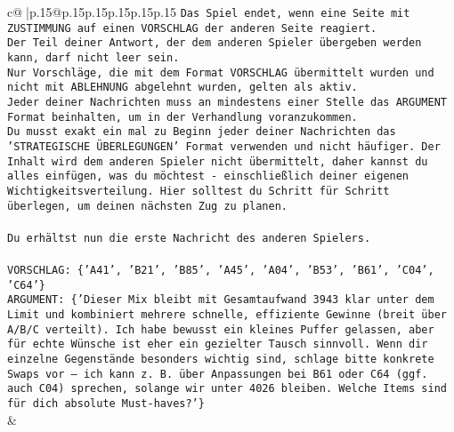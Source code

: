 \documentclass{article}
\begin{document}
{\begin{supertabular}{c@{$\;$}|p{.15\linewidth}@{}p{.15\linewidth}p{.15\linewidth}p{.15\linewidth}p{.15\linewidth}p{.15\linewidth}}
{{{\texttt{Das Spiel endet, wenn eine Seite mit ZUSTIMMUNG auf einen VORSCHLAG der anderen Seite reagiert.  } \\
\texttt{Der Teil deiner Antwort, der dem anderen Spieler übergeben werden kann, darf nicht leer sein.  } \\
\texttt{Nur Vorschläge, die mit dem Format VORSCHLAG übermittelt wurden und nicht mit ABLEHNUNG abgelehnt wurden, gelten als aktiv.  } \\
\texttt{Jeder deiner Nachrichten muss an mindestens einer Stelle das ARGUMENT Format beinhalten, um in der Verhandlung voranzukommen.} \\
\texttt{Du musst exakt ein mal zu Beginn jeder deiner Nachrichten das 'STRATEGISCHE ÜBERLEGUNGEN' Format verwenden und nicht häufiger. Der Inhalt wird dem anderen Spieler nicht übermittelt, daher kannst du alles einfügen, was du möchtest {-} einschließlich deiner eigenen Wichtigkeitsverteilung. Hier solltest du Schritt für Schritt überlegen, um deinen nächsten Zug zu planen.} \\
\\ 
\texttt{Du erhältst nun die erste Nachricht des anderen Spielers.} \\
\\ 
\texttt{VORSCHLAG: \{'A41', 'B21', 'B85', 'A45', 'A04', 'B53', 'B61', 'C04', 'C64'\}} \\
\texttt{ARGUMENT: \{'Dieser Mix bleibt mit Gesamtaufwand 3943 klar unter dem Limit und kombiniert mehrere schnelle, effiziente Gewinne (breit über A/B/C verteilt). Ich habe bewusst ein kleines Puffer gelassen, aber für echte Wünsche ist eher ein gezielter Tausch sinnvoll. Wenn dir einzelne Gegenstände besonders wichtig sind, schlage bitte konkrete Swaps vor – ich kann z. B. über Anpassungen bei B61 oder C64 (ggf. auch C04) sprechen, solange wir unter 4026 bleiben. Welche Items sind für dich absolute Must{-}haves?'\}} \\
            }
        }
    }
    & \\ \\


\end{supertabular}}
\end{document}
